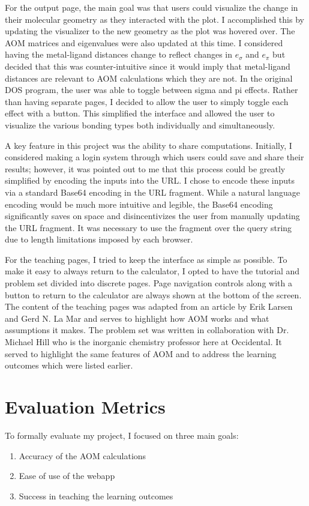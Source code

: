 \documentclass[10pt,twocolumn]{article}
\begin{document}
For the output page, the main goal was that users could visualize the change in their molecular geometry as they interacted with the plot. I accomplished this by updating the visualizer to the new geometry as the plot was hovered over. The AOM matrices and eigenvalues were also updated at this time. I considered having the metal-ligand distances change to reflect changes in $e_\sigma$ and $e_\pi$ but decided that this was counter-intuitive since it would imply that metal-ligand distances are relevant to AOM calculations which they are not. In the original DOS program, the user was able to toggle between sigma and pi effects. Rather than having separate pages, I decided to allow the user to simply toggle each effect with a button. This simplified the interface and allowed the user to visualize the various bonding types both individually and simultaneously.

A key feature in this project was the ability to share computations. Initially, I considered making a login system through which users could save and share their results; however, it was pointed out to me that this process could be greatly simplified by encoding the inputs into the URL. I chose to encode these inputs via a standard Base64 encoding in the URL fragment. While a natural language encoding would be much more intuitive and legible, the Base64 encoding significantly saves on space and disincentivizes the user from manually updating the URL fragment. It was necessary to use the fragment over the query string due to length limitations imposed by each browser. 

For the teaching pages, I tried to keep the interface as simple as possible. To make it easy to always return to the calculator, I opted to have the tutorial and problem set divided into discrete pages. Page navigation controls along with a button to return to the calculator are always shown at the bottom of the screen. The content of the teaching pages was adapted from an article by Erik Larsen and Gerd N. La Mar and serves to highlight how AOM works and what assumptions it makes. The problem set was written in collaboration with Dr. Michael Hill who is the inorganic chemistry professor here at Occidental. It served to highlight the same features of AOM and to address the learning outcomes which were listed earlier.

\section{Evaluation Metrics}
To formally evaluate my project, I focused on three main goals:
\begin{enumerate}
	\item Accuracy of the AOM calculations
	\item Ease of use of the webapp
	\item Success in teaching the learning outcomes
\end{enumerate}
\end{document}
